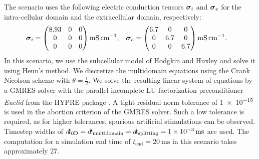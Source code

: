 The scenario uses the following electric conduction tensors $\boldsymbol{\sigma}_i$ and $\boldsymbol{\sigma}_e$ for the intra-cellular domain and the extracellular domain, respectively:
\begin{align}\label{eq:multidomain_isotropic_e}
  \bfsigma_i &= \mat{
  8.93 & 0 & 0\\
  0& 0& 0\\
  0& 0& 0}\SI{}{\milli\siemens\per\centi\meter}, &  \bfsigma_e &= \mat{6.7 & 0 & 0\\
        0& 6.7& 0\\
        0& 0& 6.7}\SI{}{\milli\siemens\per\centi\meter}.
\end{align}
%
In this scenario, we use the subcellular model of Hodgkin and Huxley \cite{Hodgkin1952} and solve it using Heun's method. We discretize the multidomain equations using the Crank Nicolson scheme with $\theta=\frac12$.
We solve the resulting linear system of equations by a GMRES solver with the parallel incomplete LU factorization preconditioner \emph{Euclid} \cite{euclid} from the HYPRE package \cite{falgout2002hypre}. A tight residual norm tolerance of \num{1e-15} is used in the abortion criterion of the GMRES solver. Such a low tolerance is required, as for higher tolerances, spurious artificial stimulations can be observed. Timestep widths of $\dt_\text{0D}=\dt_\text{multidomain}=\dt_\text{splitting}=\SI{1e-3}{\ms}$ are used. 
The computation for a simulation end time of $t_\text{end}=\SI{20}{\ms}$ in this scenario takes approximately \SI{27}{\min}.


       
